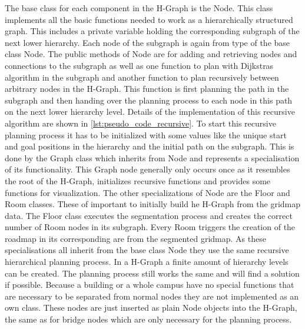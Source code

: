 The base class for each component in the H-Graph is the Node. This class implements all the basic functions needed to work as a hierarchically structured graph. This includes a private variable holding the corresponding subgraph of the next lower hierarchy. Each node of the subgraph is again from type of the base class Node. The public methods of Node are for adding and retrieving nodes and connections to the subgraph as well as one function to plan with Dijkstras algorithm in the subgraph and another function to plan recursively between arbitrary nodes in the H-Graph. This function is first planning the path in the subgraph and then handing over the planning process to each node in this path on the next lower hierarchy level. Details of the implementation of this recursive algorithm are shown in \ref{lst:pseudo_code_recursive}. To start this recursive planning process it has to be initialized with some values like the unique start and goal positions in the hierarchy and the initial path on the subgraph. This is done by the Graph class which inherits from Node and represents a specialisation of its functionality. This Graph node generally only occurs once as it resembles the root of the H-Graph, initializes recursive functions and provides some functions for visualization. The other specializations of Node are the Floor and Room classes. These of important to initially build he H-Graph from the gridmap data. The Floor class executes the segmentation process and creates the correct number of Room nodes in its subgraph. Every Room triggers the creation of the roadmap in its corresponding are from the segmented gridmap. As these specialisations all inherit from the base class Node they use the same recursive hierarchical planning process. In a H-Graph a finite amount of hierarchy levels can be created. The planning process still works the same and will find a solution if possible. Because a building or a whole campus have no special functions that are necessary to be separated from normal nodes they are not implemented as an own class. These nodes are just inserted as plain Node objects into the H-Graph, the same as for bridge nodes which are only necessary for the planning process.


